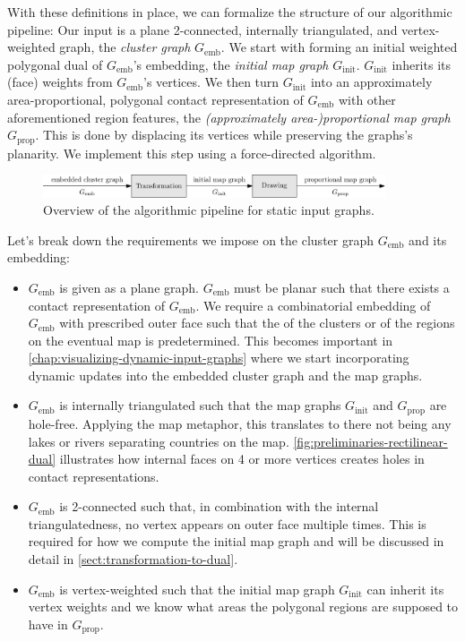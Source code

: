 With these definitions in place, we can formalize the structure of our algorithmic pipeline: Our input is a plane 2-connected, internally triangulated, and vertex-weighted graph, the \emph{cluster graph} $G_\text{emb}$.
We start with forming an initial weighted polygonal dual of $G_\text{emb}$'s embedding, the \emph{initial map graph} $G_\text{init}$.
$G_\text{init}$ inherits its (face) weights from $G_\text{emb}$'s vertices.
We then turn $G_\text{init}$ into an approximately area-proportional, polygonal contact representation of $G_\text{emb}$ with other aforementioned region features, the \emph{(approximately area-)proportional map graph} $G_\text{prop}$.
This is done by displacing its vertices while preserving the graphs's planarity.
We implement this step using a force-directed algorithm.

\begin{figure}[H]
	\centering\includegraphics[width=0.9\textwidth]{Resources/Pipeline-Thesis-Static.pdf}
	\caption{Overview of the algorithmic pipeline for static input graphs.}
	\label{fig:static-pipeline-thesis}
\end{figure}

Let's break down the requirements we impose on the cluster graph $G_\text{emb}$ and its embedding:

\begin{itemize}
\item $G_\text{emb}$ is given as a plane graph.
$G_\text{emb}$ must be planar such that there exists a contact representation of $G_\text{emb}$.
We require a combinatorial embedding of $G_\text{emb}$ with prescribed outer face such that the  of the clusters or of the regions on the eventual map is predetermined.
This becomes important in \cref{chap:visualizing-dynamic-input-graphs} where we start incorporating dynamic updates into the embedded cluster graph and the map graphs.
\item $G_\text{emb}$ is internally triangulated such that the map graphs $G_\text{init}$ and $G_\text{prop}$ are hole-free.
Applying the map metaphor, this translates to there not being any lakes or rivers separating countries on the map.
\cref{fig:preliminaries-rectilinear-dual} illustrates how internal faces on 4 or more vertices creates holes in contact representations.
\item $G_\text{emb}$ is 2-connected such that, in combination with the internal triangulatedness, no vertex appears on outer face multiple times.
This is required for how we compute the initial map graph and will be discussed in detail in \cref{sect:transformation-to-dual}.
\item $G_\text{emb}$ is vertex-weighted such that the initial map graph $G_\text{init}$ can inherit its vertex weights and we know what areas the polygonal regions are supposed to have in $G_\text{prop}$.
\end{itemize}

